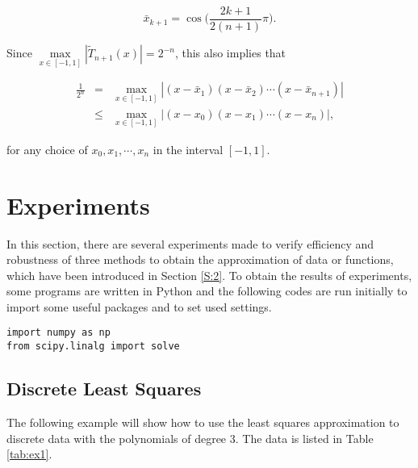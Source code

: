\documentclass[preprint,12pt]{elsarticle}
\begin{document}
\[
\bar{x}_{k+1}=\cos \biggl(\frac{2k+1}{2(n+1)}\pi\biggr).
\]

Since $\max\limits_{x\in [-1,1]}|\tilde{T}_{n+1}(x)|=2^{-n}$, this also implies that

\begin{eqnarray*}
\frac{1}{2^n}&=&\max_{x\in[-1,1]} |(x-\bar{x}_1)(x-\bar{x}_2)\cdots
(x-\bar{x}_{n+1})|\\
& \le& \max_{x\in[-1,1]}|(x-x_0)(x-x_1)\cdots (x-x_n)|,
\end{eqnarray*}

for any choice of $x_0,x_1,\cdots,x_n$ in the interval $[-1,1]$.

\section{Experiments}
\label{S:3}

In this section, there are several experiments made to verify efficiency and robustness of three methods to obtain the approximation of data or functions, which have been introduced in Section \ref{S:2}. To obtain the results of experiments, some programs are written in Python and the following codes are run initially to import some useful packages and to set used settings.

\begin{lstlisting}
import numpy as np
from scipy.linalg import solve
\end{lstlisting}

\subsection{Discrete Least Squares}
\label{SS:3.1}

The following example will show how to use the least squares approximation to discrete data with the polynomials of degree $3$. The data is listed in Table \ref{tab:ex1}.

\begin{table}[h]
    \caption{Example of Discrete Polynomial Approximation}
    \label{tab:ex1}
\end{table}
\end{document}
